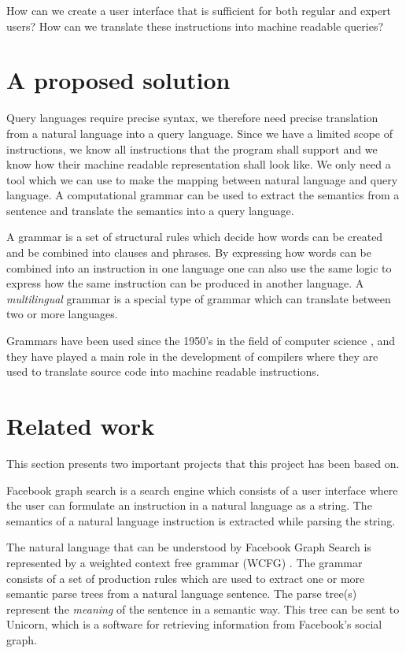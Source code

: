 How can we create a user interface that is sufficient for both regular and expert users? How can we translate these instructions into machine readable queries?

\section{A proposed solution}
Query languages require precise syntax, we therefore need precise translation from a natural language into a query language. Since we have a limited scope of instructions, we know all instructions that the program shall support and we know how their machine readable representation shall look like. We only need a tool which we can use to make the mapping between natural language and query language. A computational grammar can be used to extract the semantics from a sentence and translate the semantics into a query language. \cite{citation-needed}

A grammar is a set of structural rules which decide how words can be created and be combined into clauses and phrases. By expressing how words can be combined into an instruction in one language one can also use the same logic to express how the same instruction can be produced in another language. A \emph{multilingual} grammar is a special type of grammar which can translate between two or more languages. \cite{citation-needed}

Grammars have been used since the 1950's in the field of computer science \cite[p. 4]{ranta:2011}, and they have played a main role in the development of compilers where they are used to translate source code into machine readable instructions.

\section{Related work}
This section presents two important projects that this project has been based on.

Facebook graph search \cite{facebook-graph-search} is a search engine which consists of a user interface where the user can formulate an instruction in a natural language as a string. The semantics of a natural language instruction is extracted while parsing the string.

The natural language that can be understood by Facebook Graph Search is represented by a weighted context free grammar (WCFG) \cite{li:2013}. The grammar consists of a set of production rules which are used to extract one or more semantic parse trees from a natural language sentence. The parse tree(s) represent the \emph{meaning} of the sentence in a semantic way. This tree can be sent to Unicorn, which is a software for retrieving information from Facebook's social graph. \cite{citation-needed}

